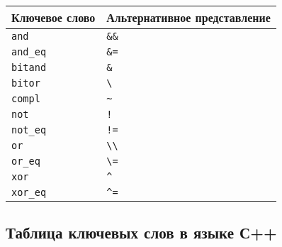 \begin{longtable}[]{@{}ll@{}}
\toprule\noalign{}
Ключевое слово & Альтернативное представление \\
\midrule\noalign{}
\endhead
\bottomrule\noalign{}
\endlastfoot
\texttt{and} & \texttt{\&\&} \\
\texttt{and\_eq} & \texttt{\&=} \\
\texttt{bitand} & \texttt{\&} \\
\texttt{bitor} & \texttt{\textbackslash{}\textbar{}} \\
\texttt{compl} & \texttt{\textasciitilde{}} \\
\texttt{not} & \texttt{!} \\
\texttt{not\_eq} & \texttt{!=} \\
\texttt{or} &
\texttt{\textbackslash{}\textbar{}\textbackslash{}\textbar{}} \\
\texttt{or\_eq} & \texttt{\textbackslash{}\textbar{}=} \\
\texttt{xor} & \texttt{\^{}} \\
\texttt{xor\_eq} & \texttt{\^{}=} \\
\end{longtable}

\subsection{\texorpdfstring{Таблица ключевых слов в языке
\textbf{С++}}{Таблица ключевых слов в языке С++}}\label{ux442ux430ux431ux43bux438ux446ux430-ux43aux43bux44eux447ux435ux432ux44bux445-ux441ux43bux43eux432-ux432-ux44fux437ux44bux43aux435-ux441}

